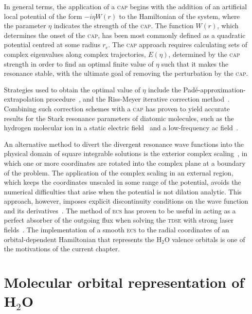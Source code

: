 In general terms, the application of a \textsc{cap} begins with the
addition of an artificial local potential of the form $-i \eta W(r)$
to the Hamiltonian of the system, where the parameter $\eta$ indicates
the strength of the \textsc{cap}. The function $W(r)$, which
determines the onset of the \textsc{cap}, has been most commonly
defined as a quadratic potential centred at some radius
$r_{\mathrm{c}}$.%
The \textsc{cap} approach requires calculating sets
of complex eigenvalues along complex trajectories, $E(\eta)$,
determined by the \textsc{cap} strength in order to find an optimal
finite value of $\eta$ such that it makes the resonance stable, with
the ultimate goal of removing the perturbation by the \textsc{cap}.

Strategies used to obtain the optimal value of $\eta$ include the
Pad\'{e}-approximation-extrapolation
procedure~\cite{Moiseyev_Pade_2005}, and the Riss-Meyer iterative
correction method~\cite{RissMeyer_1993}. Combining such correction
schemes with a \textsc{cap} has proven to yield accurate results for
the Stark resonance parameters of diatomic molecules, such as the
hydrogen molecular ion in a static electric field~\cite{Tsog_2013} and
a low-frequency ac field~\cite{Tsog_H2mol_ac_2013}.

An alternative method to divert the divergent resonance wave functions
into the physical domain of square integrable solutions is the
exterior complex scaling~\cite{Simon_1979}, in which one or more
coordinates are rotated into the complex plane at a boundary of the
problem. The application of the complex scaling in an external region,
which keeps the coordinates unscaled in some range of the potential,
avoids the numerical difficulties that arise when the potential is not
dilation analytic. This approach, however, imposes explicit
discontinuity conditions on the wave function and its
derivatives~\cite{ScrinziJChemPhys_ECS}. The method of \textsc{ecs}
has proven to be useful in acting as a perfect absorber of the
outgoing flux when solving the \textsc{tdse} with strong laser
fields~\cite{ecsScrinzi}. The implementation of a smooth \textsc{ecs}
to the radial coordinates of an orbital-dependent Hamiltonian that
represents the H$_{2}$O valence orbitals is one of the motivations of
the current chapter.


\section{Molecular orbital representation of H$_{2}$O}
\label{ch:h2o_structure}

